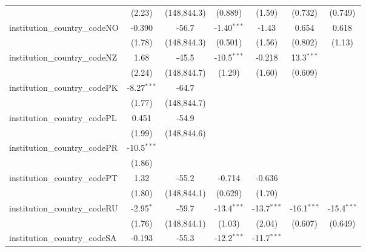 \begin{tabular}{lcccccc}
                                         & (2.23)        & (148,844.3)   & (0.889)       & (1.59)        & (0.732)       & (0.749)\\   
   institution\_country\_codeNO          & -0.390        & -56.7         & -1.40$^{***}$ & -1.43         & 0.654         & 0.618\\   
                                         & (1.78)        & (148,844.3)   & (0.501)       & (1.56)        & (0.802)       & (1.13)\\   
   institution\_country\_codeNZ          & 1.68          & -45.5         & -10.5$^{***}$ & -0.218        & 13.3$^{***}$  &   \\   
                                         & (2.24)        & (148,844.7)   & (1.29)        & (1.60)        & (0.609)       &   \\   
   institution\_country\_codePK          & -8.27$^{***}$ & -64.7         &               &               &               &   \\   
                                         & (1.77)        & (148,844.7)   &               &               &               &   \\   
   institution\_country\_codePL          & 0.451         & -54.9         &               &               &               &   \\   
                                         & (1.99)        & (148,844.6)   &               &               &               &   \\   
   institution\_country\_codePR          & -10.5$^{***}$ &               &               &               &               &   \\   
                                         & (1.86)        &               &               &               &               &   \\   
   institution\_country\_codePT          & 1.32          & -55.2         & -0.714        & -0.636        &               &   \\   
                                         & (1.80)        & (148,844.1)   & (0.629)       & (1.70)        &               &   \\   
   institution\_country\_codeRU          & -2.95$^{*}$   & -59.7         & -13.4$^{***}$ & -13.7$^{***}$ & -16.1$^{***}$ & -15.4$^{***}$\\   
                                         & (1.76)        & (148,844.1)   & (1.03)        & (2.04)        & (0.607)       & (0.649)\\   
   institution\_country\_codeSA          & -0.193        & -55.3         & -12.2$^{***}$ & -11.7$^{***}$ &               &   \\   

\end{tabular}
